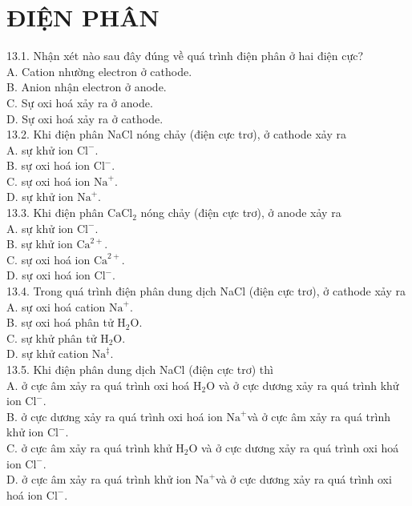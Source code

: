 \documentclass[10pt]{article}
\begin{document}
\section*{ĐIỆN PHÂN}
13.1. Nhận xét nào sau đây đúng về quá trình điện phân ở hai điện cực?\\
A. Cation nhường electron ở cathode.\\
B. Anion nhận electron ở anode.\\
C. Sự oxi hoá xảy ra ở anode.\\
D. Sự oxi hoá xảy ra ở cathode.\\
13.2. Khi điện phân NaCl nóng chảy (điện cực trơ), ở cathode xảy ra\\
A. sự khử ion $\mathrm{Cl}^{-}$.\\
B. sự oxi hoá ion $\mathrm{Cl}^{-}$.\\
C. sự oxi hoá ion $\mathrm{Na}^{+}$.\\
D. sự khử ion $\mathrm{Na}^{+}$.\\
13.3. Khi điện phân $\mathrm{CaCl}_{2}$ nóng chảy (điện cực trơ), ở anode xảy ra\\
A. sự khử ion $\mathrm{Cl}^{-}$.\\
B. sự khử ion $\mathrm{Ca}^{2+}$.\\
C. sự oxi hoá ion $\mathrm{Ca}^{2+}$.\\
D. sự oxi hoá ion $\mathrm{Cl}^{-}$.\\
13.4. Trong quá trình điện phân dung dịch NaCl (điện cực trơ), ở cathode xảy ra\\
A. sự oxi hoá cation $\mathrm{Na}^{+}$.\\
B. sự oxi hoá phân tử $\mathrm{H}_{2} \mathrm{O}$.\\
C. sự khử phân tử $\mathrm{H}_{2} \mathrm{O}$.\\
D. sự khử cation $\mathrm{Na}^{\ddagger}$.\\
13.5. Khi điện phân dung dịch NaCl (điện cực trơ) thì\\
A. ở cực âm xảy ra quá trình oxi hoá $\mathrm{H}_{2} \mathrm{O}$ và ở cực dương xảy ra quá trình khử ion $\mathrm{Cl}^{-}$.\\
B. ở cực dương xảy ra quá trình oxi hoá ion $\mathrm{Na}^{+}$và ở cực âm xảy ra quá trình khử ion $\mathrm{Cl}^{-}$.\\
C. ở cực âm xảy ra quá trình khử $\mathrm{H}_{2} \mathrm{O}$ và ở cực dương xảy ra quá trình oxi hoá ion $\mathrm{Cl}^{-}$.\\
D. ở cực âm xảy ra quá trình khử ion $\mathrm{Na}^{+}$và ở cực dương xảy ra quá trình oxi hoá ion $\mathrm{Cl}^{-}$.\\
\end{document}
